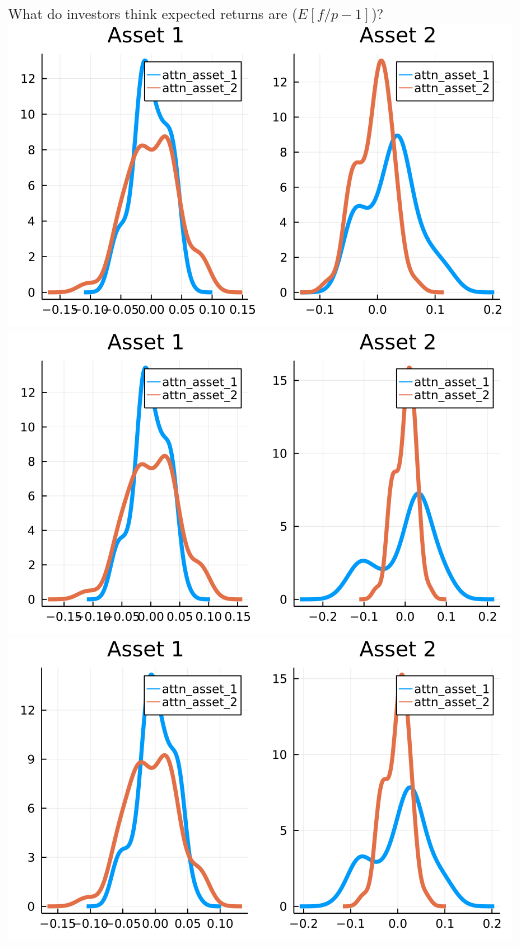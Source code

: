\documentclass[
  ignorenonframetext,
]{beamer}
\begin{document}
\begin{frame}{What do investors think expected returns are
(\(E[f/p - 1]\))?}
\protect\hypertarget{what-do-investors-think-expected-returns-are-efp---1}{}
\includegraphics[width=0.4\paperheight]{complexity_files/figure-beamer/unnamed-chunk-16-1}
\includegraphics[width=0.4\paperheight]{complexity_files/figure-beamer/unnamed-chunk-16-2}
\includegraphics[width=0.4\paperheight]{complexity_files/figure-beamer/unnamed-chunk-16-3}

\end{frame}
\end{document}

